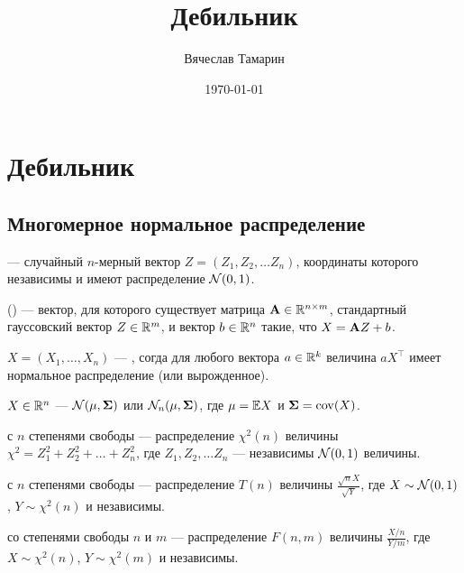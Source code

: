 \documentclass[11pt]{book}
\title{Дебильник}
\date{\today}
\author{Вячеслав Тамарин}
\begin{document}
\chapter{Дебильник}
\section{Многомерное нормальное распределение}
\begin{definition}
	 --- случайный $n$-мерный вектор $ Z = (Z_1, Z_2, \ldots Z_{n})$, координаты которого независимы и имеют распределение $ \mathcal{N}(0, 1)$.
\end{definition}

\begin{definition}[]
	 () --- вектор, для которого существует матрица $ {\bf A} \in \mathbb{R}^{n \times m} $, стандартный гауссовский вектор $ Z \in \mathbb{R}^{m}$, и вектор $ b \in \mathbb{R}^{n}$ такие, что $ X = {\bf A}Z + b $.
\end{definition}

\begin{definition}[]
	$X = (X_1, \ldots , X_{n})$ --- , согда для любого вектора  $a \in \mathbb{R}^{k}$ величина $a X^{\top}$ имеет нормальное распределение (или вырожденное).
\end{definition}

\begin{definition}[]
	 $ X \in \mathbb{R}^{n}$ --- $ \mathcal{N}(\mu, {\bf \Sigma}) $ или $ \mathcal{N}_n(\mu, {\bf \Sigma}) $, где $ \mu = \mathbb{E} X$ и $ {\bf \Sigma} = \operatorname{cov}(X) $.
\end{definition}

\begin{definition}[]
	 с $ n$ степенями свободы --- распределение $ \chi^2(n) $ величины $ \chi^2 = Z_1^2 + Z_2^2 + \ldots + Z_{n}^2 $, где $ Z_{1}, Z_2, \ldots Z_{n}$ --- независимы $ \mathcal{N}(0, 1)$ величины. 
\end{definition}

\begin{definition}[]
	 с $n$ степенями свободы --- распределение $T(n)$ величины $\frac{\sqrt{n}X}{\sqrt{Y}}$, где $X \sim \mathcal{N}(0, 1)$, $Y \sim \chi^2(n)$ и независимы.
\end{definition}

\begin{definition}[]
	 со степенями свободы $n$ и $m$ --- распределение $F(n, m)$ величины $\frac{X / n}{Y / m}$, где $X \sim \chi^2(n)$, $Y \sim \chi^2(m)$ и независимы.
\end{definition}
\end{document}
